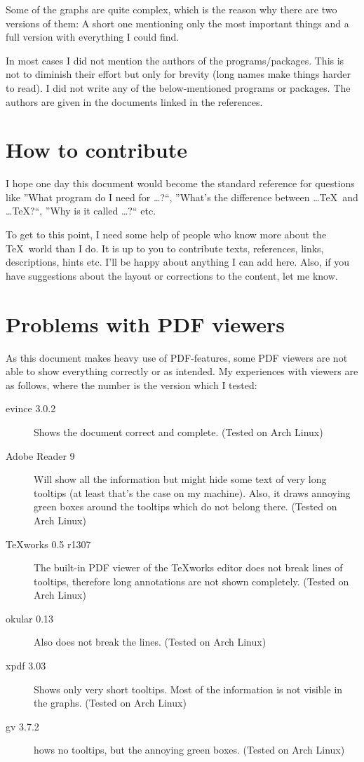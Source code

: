 Some of the graphs are quite complex, which is the reason why there are two versions of them: A short one mentioning only the most important things and a full version with everything I could find.

In most cases I did not mention the authors of the programs/packages. This is not to diminish their effort but only for brevity (long names make things harder to read). I did not write any of the below-mentioned programs or packages. The authors are given in the documents linked in the references.

\section{How to contribute}
I hope one day this document would become the standard reference for questions like ”What program do I need for …?“, ”What's the difference between …\TeX\ and …\TeX?“, ”Why is it called …?“ etc.

To get to this point, I need some help of people who know more about the \TeX\ world than I do. It is up to you to contribute texts, references, links, descriptions, hints etc. I'll be happy about anything I can add here. Also, if you have suggestions about the layout or corrections to the content, let me know.

\section{Problems with PDF viewers}
As this document makes heavy use of PDF-features, some PDF viewers are not able to show everything correctly or as intended. My experiences with viewers are as follows, where the number is the version which I tested:

\begin{description}
\item[evince 3.0.2] Shows the document correct and complete. (Tested on Arch Linux)

\item[Adobe Reader 9] Will show all the information but might hide some text of very long tooltips (at least that's the case on my machine). Also, it draws annoying green boxes around the tooltips which do not belong there. (Tested on Arch Linux)

\item[\TeX works 0.5 r1307] The built-in PDF viewer of the \TeX works editor does not break lines of tooltips, therefore long annotations are not shown completely. (Tested on Arch Linux)

\item[okular 0.13] Also does not break the lines. (Tested on Arch Linux)

\item[xpdf 3.03] Shows only very short tooltips. Most of the information is not visible in the graphs. (Tested on Arch Linux)

\item[gv 3.7.2] hows no tooltips, but the annoying green boxes. (Tested on Arch Linux)
\end{description}

